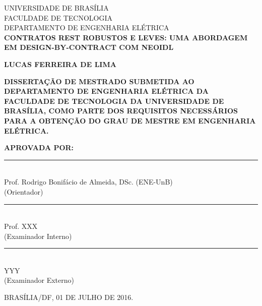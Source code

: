 \begin{bf}
\begin{center}
{\normalsize UNIVERSIDADE DE BRASÍLIA}\\
{\normalsize FACULDADE DE TECNOLOGIA}\\
{\normalsize DEPARTAMENTO DE ENGENHARIA ELÉTRICA}\\

\vspace{10mm}
{\large {\bf  CONTRATOS REST ROBUSTOS E LEVES: UMA ABORDAGEM EM
DESIGN-BY-CONTRACT COM NEOIDL }}

\vspace{10mm}
{\large {\bf LUCAS FERREIRA DE LIMA}}
\end{center}
\end{bf}

\vspace{10mm}

\noindent\MakeUppercase{ {\bf
Dissertação de Mestrado submetida ao
Departamento de Engenharia Elétrica
da Faculdade de Tecnologia da Universidade de Brasília,
como parte dos requisitos necessários para a obtenção do grau de mestre em
ENGENHARIA ELÉTRICA. }}

\vspace{5mm}

\noindent\MakeUppercase{ {\bf Aprovada por:}}

\vspace{10mm}

\begin{bf}
\noindent\rule{120mm}{0.1mm}\\
{ Prof. Rodrigo Bonifácio de Almeida, DSc. (ENE-UnB) }\\
{(Orientador)}

\vspace{7.5mm}

\noindent\rule{120mm}{0.1mm}\\
{ Prof. XXX}\\
{(Examinador Interno)}

\vspace{7.5mm}

\noindent\rule{120mm}{0.1mm}\\
{  YYY }\\
{(Examinador Externo)}

\vspace{7.5mm}

\vspace{7.5mm}
\noindent\MakeUppercase{Brasília/DF, 01 DE JULHO DE 2016.}
\end{bf}

\pagebreak


